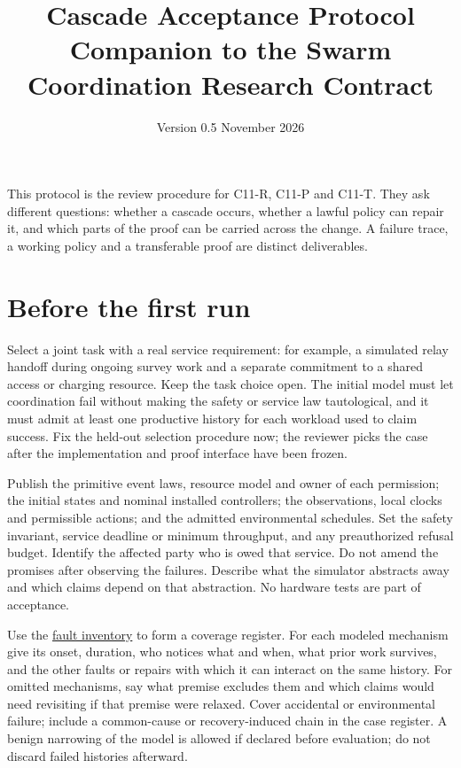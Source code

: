 \documentclass[11pt]{article}
\title{Cascade Acceptance Protocol\\Companion to the Swarm Coordination Research Contract}
\author{}
\date{Version 0.5 \quad 24 November 2026}
\begin{document}
\maketitle

This protocol is the review procedure for C11-R, C11-P and C11-T. They ask different questions: whether a cascade occurs, whether a lawful policy can repair it, and which parts of the proof can be carried across the change. A failure trace, a working policy and a transferable proof are distinct deliverables.

\section{Before the first run}

Select a joint task with a real service requirement: for example, a simulated relay handoff during ongoing survey work and a separate commitment to a shared access or charging resource. Keep the task choice open. The initial model must let coordination fail without making the safety or service law tautological, and it must admit at least one productive history for each workload used to claim success. Fix the held-out selection procedure now; the reviewer picks the case after the implementation and proof interface have been frozen.

Publish the primitive event laws, resource model and owner of each permission; the initial states and nominal installed controllers; the observations, local clocks and permissible actions; and the admitted environmental schedules. Set the safety invariant, service deadline or minimum throughput, and any preauthorized refusal budget. Identify the affected party who is owed that service. Do not amend the promises after observing the failures. Describe what the simulator abstracts away and which claims depend on that abstraction. No hardware tests are part of acceptance.

Use the \href{https://github.com/eternal-november/eos-research-programmes/blob/e1348964f73704212d2d8b48d5982a5ed600a2ff/projects/byzantine-control/FAULT-COVERAGE.md}{fault inventory} to form a coverage register. For each modeled mechanism give its onset, duration, who notices what and when, what prior work survives, and the other faults or repairs with which it can interact on the same history. For omitted mechanisms, say what premise excludes them and which claims would need revisiting if that premise were relaxed. Cover accidental or environmental failure; include a common-cause or recovery-induced chain in the case register. A benign narrowing of the model is allowed if declared before evaluation; do not discard failed histories afterward.
\end{document}
